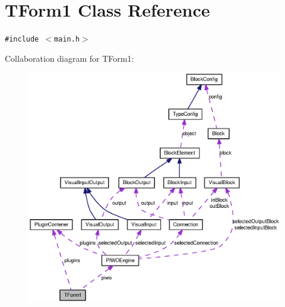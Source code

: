\hypertarget{classTForm1}{
\section{TForm1 Class Reference}
\label{classTForm1}
}
{\tt \#include $<$main.h$>$}

Collaboration diagram for TForm1:\nopagebreak
\begin{figure}[H]
\begin{center}
\leavevmode
\includegraphics[width=400pt]{classTForm1__coll__graph}
\end{center}
\end{figure}
